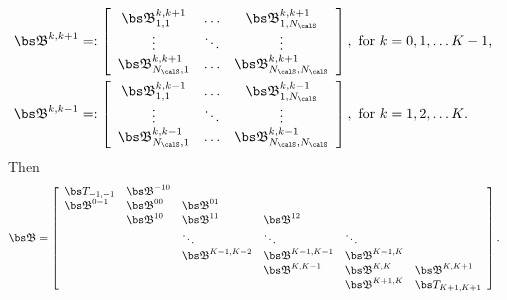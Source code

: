 \begin{align*}
\\ {  {\mathfrak{\bs B}}}^{k,k+1}%
%
&=:\left[\begin{array}{ccc} {  {\mathfrak{\bs B}}}^{k,k+1}_{1,1}& \hdots &  {  {\mathfrak{\bs B}}}^{k,k+1}_{1,N_\calS}\\  \vdots &\ddots & \vdots \\  {  {\mathfrak{\bs B}}}^{k,k+1}_{N_\calS,1} & \hdots & {  {\mathfrak{\bs B}}}^{k,k+1}_{N_\calS,N_\calS} \end{array}\right],\mbox{ for \(k=0,1,\dots K-1\),}
%
\\ {  {\mathfrak{\bs B}}}^{k,k-1}%
%
&=:\left[\begin{array}{ccc} {  {\mathfrak{\bs B}}}^{k,k-1}_{1,1}& \hdots &  {  {\mathfrak{\bs B}}}^{k,k-1}_{1,N_\calS}\\  \vdots &\ddots & \vdots \\  {  {\mathfrak{\bs B}}}^{k,k-1}_{N_\calS,1} & \hdots & {  {\mathfrak{\bs B}}}^{k,k-1}_{N_\calS,N_\calS} \end{array}\right], \mbox{ for \(k=1,2,\dots K\).}
\end{align*} 
Then
\begin{align*}
{  {\mathfrak{\bs B}}} &= \left[\begin{array}{llllll}
	\bs T_{{-1},{-1}}&  {  {\mathfrak{\bs B}}}^{{-1}0} & & & & \\
	 {  {\mathfrak{\bs B}}}^{0{-1}} &  {  {\mathfrak{\bs B}}}^{00} &  {  {\mathfrak{\bs B}}}^{01} & & & \\
	&  {  {\mathfrak{\bs B}}}^{10} &  {  {\mathfrak{\bs B}}}^{11} &  {  {\mathfrak{\bs B}}}^{12} & & \\
	& & \ddots & \ddots & \ddots & \\
	& &  {   {\mathfrak{\bs B}}}^{K-1,K-2} & {   {\mathfrak{\bs B}}}^{K-1,K-1} &  {  {\mathfrak{\bs B}}}^{K-1,K} & \\
	& & & {   {\mathfrak{\bs B}}}^{K,K-1} &  {  {\mathfrak{\bs B}}}^{K,K} &  {  {\mathfrak{\bs B}}}^{K,{K+1}} \\
	& & & &  {  {\mathfrak{\bs B}}}^{{K+1}, K} & \bs T_{{K+1},{K+1}}
\end{array}\right].\end{align*}


